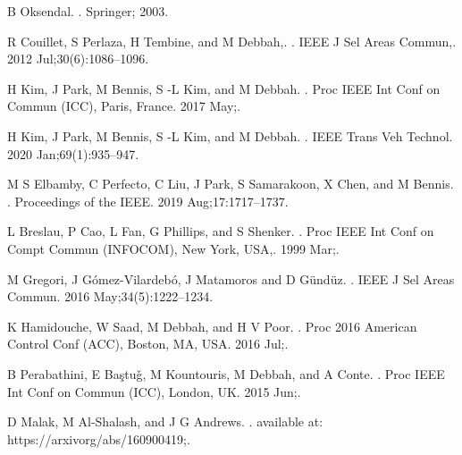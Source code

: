 \documentclass{book}
\begin{document}
\begin{thebibliography}{10}
  {B  Oksendal}.
  .
  \newblock Springer; 2003.
  
  {R  Couillet, S  Perlaza, H  Tembine, and M  Debbah,}.
  .
  \newblock IEEE J Sel Areas Commun,. 2012 Jul;30(6):1086--1096.
  
  {H  Kim, J  Park, M  Bennis, S -L  Kim, and M  Debbah}.
  .
  \newblock Proc IEEE Int Conf on Commun (ICC), Paris, France. 2017 May;.
  
  {H  Kim, J  Park, M  Bennis, S -L  Kim, and M  Debbah}.
  .
  \newblock IEEE Trans Veh Technol. 2020 Jan;69(1):935--947.
  
  {M  S  Elbamby, C  Perfecto, C  Liu, J  Park, S  Samarakoon, X  Chen, and M
    Bennis}.
  .
  \newblock Proceedings of the IEEE. 2019 Aug;17:1717--1737.
  
  {L  Breslau, P  Cao, L  Fan, G  Phillips, and S  Shenker}.
  .
  \newblock Proc IEEE Int Conf on Compt Commun (INFOCOM), New York, USA,. 1999
    Mar;.
  
  {M  Gregori, J  G\'omez-Vilardeb\'o, J  Matamoros and D  G\"{u}nd\"{u}z}.
  .
  \newblock IEEE J Sel Areas Commun. 2016 May;34(5):1222--1234.
  
  {K  Hamidouche, W  Saad, M  Debbah, and H  V  Poor}.
  .
  \newblock Proc 2016 American Control Conf (ACC), Boston, MA, USA. 2016 Jul;.
  
  {B  Perabathini, E  Ba\c{s}tu\v{g}, M  Kountouris, M  Debbah, and A  Conte}.
  .
  \newblock Proc IEEE Int Conf on Commun (ICC), London, UK. 2015 Jun;.
  
  {D  Malak, M  Al-Shalash, and J  G  Andrews}.
  .
  \newblock available at: https://arxivorg/abs/160900419;.
  

\end{thebibliography}
\end{document}
